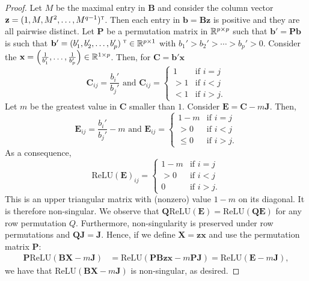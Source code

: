 \begin{proof}
Let $M$ be the maximal entry in $\mathbf{B}$ and consider the column vector $\mathbf{z}=(1,M,M^2,\ldots,M^{q-1})^{\textsc{t}}$.
Then each entry in $\mathbf{b}=\mathbf{B}\mathbf{z}$ is positive and they are all pairwise distinct. 
Let $\mathbf{P}$ be a permutation matrix in $\mathbb{R}^{p\times p}$ such that $\mathbf{b}'=\mathbf{P}\mathbf{b}$ is such that  $\mathbf{b}'=(b_1',b_2',\ldots,b_p')^{\textsc{	t}}\in\mathbb{R}^{p\times 1}$ with $ b_1'> b_2'>\cdots > b_p'>0$. 
Consider the $\mathbf{x}=\left(\frac{1}{b_1'},\ldots,\frac{1}{b_p'}\right)\in \mathbb{R}^{1\times p}$. Then, for $\mathbf{C}=\mathbf{b}'\mathbf{x}$
$$
\mathbf{C}_{ij}=\frac{b_i'}{b_j'}  \text{ and } \mathbf{C}_{ij}=\begin{cases}  1 & \text{if $i=j$}\\
>1 & \text{if $i<j$}\\
< 1 & \text{if $i>j$}.
\end{cases}
$$
Let $m$ be the greatest value  in $\mathbf{C}$ smaller than $1$.
Consider $\mathbf{E}=\mathbf{C}- m\mathbf{J}$.
Then,
$$
\mathbf{E}_{ij}=\frac{b_i'}{b_j'}- m \text{ and } \mathbf{E}_{ij}=\begin{cases}  1-m & \text{if $i=j$} \\
> 0 & \text{if $i<j$}\\
\leq 0  & \text{if $i>j$}.
\end{cases}
$$
As a consequence,
$$
\text{ReLU}(\mathbf{E})_{ij}=\begin{cases}  1-m & \text{if $i=j$}\\
>0 & \text{if $i<j$}\\
0  & \text{if $i>j$}.
\end{cases}
$$
This is an upper triangular matrix with (nonzero) value $1-m$ on its diagonal. It is therefore non-singular. 
We observe that $\mathbf{Q}\text{ReLU}(\mathbf{E})=\text{ReLU}(\mathbf{Q}\mathbf{E})$ for any row permutation $Q$. Furthermore, non-singularity is preserved under row permutations and $\mathbf{Q}\mathbf{J}=\mathbf{J}$. Hence, if we define $\mathbf{X}=\mathbf{z}\mathbf{x}$ and use the permutation matrix $\mathbf{P}$:
\begin{align*}
\mathbf{P}\text{ReLU}(\mathbf{B}\mathbf{X}-m\mathbf{J})&=
\text{ReLU}(\mathbf{P}\mathbf{B}\mathbf{z}\mathbf{x}-m\mathbf{P}\mathbf{J})=\text{ReLU}(\mathbf{E}-m\mathbf{J}),
\end{align*}
we have that $\text{ReLU}(\mathbf{B}\mathbf{X}-m\mathbf{J})$ is non-singular, as desired.
\end{proof}

